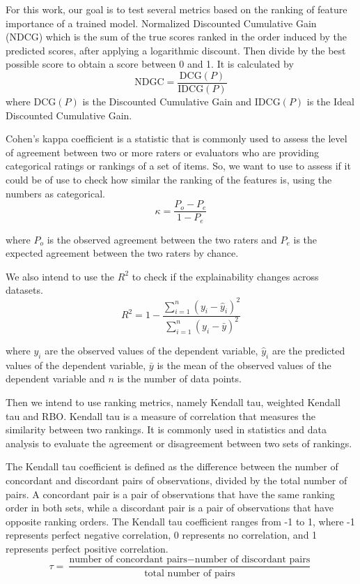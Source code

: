 For this work, our goal is to test several metrics based on the ranking of feature importance of a trained model. Normalized Discounted Cumulative Gain (NDCG) \cite{wangTheoreticalAnalysisNDCG} which is the sum of the true scores ranked in the order induced by the predicted scores, after applying a logarithmic discount. Then divide by the best possible score to obtain a score between 0 and 1. It is calculated by
\begin{equation}
\text{{NDGC}} = \frac{{\text{{DCG}}(P)}}{{\text{{IDCG}}(P)}}
\end{equation}
where $\text{{DCG}}(P)$ is the Discounted Cumulative Gain and $\text{{IDCG}}(P)$ is the Ideal Discounted Cumulative Gain. 

Cohen's kappa coefficient \cite{doi:10.1177/001316446002000104}  is a statistic that is commonly used to assess the level of agreement between two or more raters or evaluators who are providing categorical ratings or rankings of a set of items. So, we want to use to assess if it could be of use to check how similar the ranking of the features is, using the numbers as categorical.
\begin{equation}
\kappa = \frac{{P_o - P_e}}{{1 - P_e}}
\end{equation}

where \(P_o\) is the observed agreement between the two raters and \(P_e\) is the expected agreement between the two raters by chance.

We also intend to use the $R^2$ to check if the explainability changes across datasets.
\begin{equation}
R^2 = 1 - \frac{{\sum_{i=1}^n (y_i - \hat{y}_i)^2}}{{\sum_{i=1}^n (y_i - \bar{y})^2}}
\end{equation}


where \(y_i\) are the observed values of the dependent variable, \(\hat{y}_i\) are the predicted values of the dependent variable, \(\bar{y}\) is the mean of the observed values of the dependent variable and \(n\) is the number of data points.

Then we intend to use ranking metrics, namely Kendall tau, weighted Kendall tau and RBO.
Kendall tau is a measure of correlation that measures the similarity between two rankings. It is commonly used in statistics and data analysis to evaluate the agreement or disagreement between two sets of rankings.

The Kendall tau coefficient \cite{kendallTreatmentTiesRanking1945} is defined as the difference between the number of concordant and discordant pairs of observations, divided by the total number of pairs. A concordant pair is a pair of observations that have the same ranking order in both sets, while a discordant pair is a pair of observations that have opposite ranking orders. The Kendall tau coefficient ranges from -1 to 1, where -1 represents perfect negative correlation, 0 represents no correlation, and 1 represents perfect positive correlation. 
\begin{equation}
\tau = \frac{{\text{{number of concordant pairs}} - \text{{number of discordant pairs}}}}{{\text{{total number of pairs}}}}
\end{equation}

